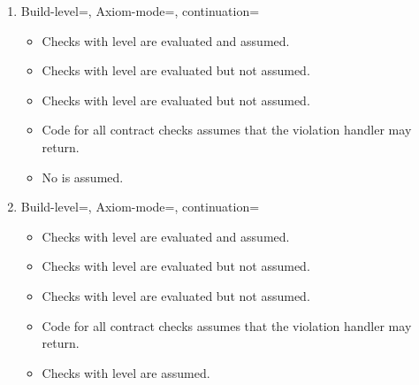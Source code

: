 \begin{enumerate}
\item Build-level=, Axiom-mode=, continuation=
\begin{itemize}
  \item Checks with  level are evaluated and assumed.
  \item Checks with  level are evaluated but not assumed.
  \item Checks with  level are evaluated but not assumed.
  \item Code for all contract checks assumes that the violation handler may return.
  \item No  is assumed.
\end{itemize}

\item Build-level=, Axiom-mode=, continuation=
\begin{itemize}
  \item Checks with  level are evaluated and assumed.
  \item Checks with  level are evaluated but not assumed.
  \item Checks with  level are evaluated but not assumed.
  \item Code for all contract checks assumes that the violation handler may return.
  \item Checks with  level are assumed.
\end{itemize}

\end{enumerate}
